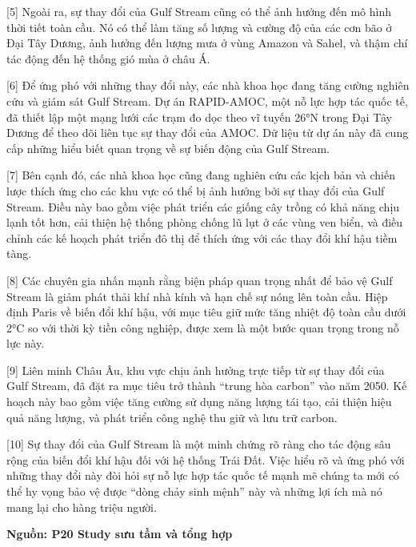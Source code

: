 \documentclass[12pt,a4paper,twoside]{article}
\newenvironment{readingpassage}[1][]{%
    \begin{tcolorbox}[enhanced, colback=grayLight, colframe=secondaryBlue,
        coltitle=textDark, fonttitle=\bfseries, title={#1},
        rounded corners, arc=3mm, boxrule=1pt,
        left=15pt, right=15pt, top=10pt, bottom=10pt,
        breakable, before skip=10pt, after skip=10pt, drop fuzzy shadow]
    \setstretch{1.3}
}{\end{tcolorbox}}
\begin{document}
\begin{readingpassage}[]
[5] Ngoài ra, sự thay đổi của Gulf Stream cũng có thể ảnh hưởng đến mô hình thời tiết toàn cầu. Nó có thể làm tăng số lượng và cường độ của các cơn bão ở Đại Tây Dương, ảnh hưởng đến lượng mưa ở vùng Amazon và Sahel, và thậm chí tác động đến hệ thống gió mùa ở châu Á.

[6] Để ứng phó với những thay đổi này, các nhà khoa học đang tăng cường nghiên cứu và giám sát Gulf Stream. Dự án RAPID-AMOC, một nỗ lực hợp tác quốc tế, đã thiết lập một mạng lưới các trạm đo dọc theo vĩ tuyến 26°N trong Đại Tây Dương để theo dõi liên tục sự thay đổi của AMOC. Dữ liệu từ dự án này đã cung cấp những hiểu biết quan trọng về sự biến động của Gulf Stream.

[7] Bên cạnh đó, các nhà khoa học cũng đang nghiên cứu các kịch bản và chiến lược thích ứng cho các khu vực có thể bị ảnh hưởng bởi sự thay đổi của Gulf Stream. Điều này bao gồm việc phát triển các giống cây trồng có khả năng chịu lạnh tốt hơn, cải thiện hệ thống phòng chống lũ lụt ở các vùng ven biển, và điều chỉnh các kế hoạch phát triển đô thị để thích ứng với các thay đổi khí hậu tiềm tàng.

[8] Các chuyên gia nhấn mạnh rằng biện pháp quan trọng nhất để bảo vệ Gulf Stream là giảm phát thải khí nhà kính và hạn chế sự nóng lên toàn cầu. Hiệp định Paris về biến đổi khí hậu, với mục tiêu giữ mức tăng nhiệt độ toàn cầu dưới 2°C so với thời kỳ tiền công nghiệp, được xem là một bước quan trọng trong nỗ lực này.

[9] Liên minh Châu Âu, khu vực chịu ảnh hưởng trực tiếp từ sự thay đổi của Gulf Stream, đã đặt ra mục tiêu trở thành ``trung hòa carbon'' vào năm 2050. Kế hoạch này bao gồm việc tăng cường sử dụng năng lượng tái tạo, cải thiện hiệu quả năng lượng, và phát triển công nghệ thu giữ và lưu trữ carbon.

[10] Sự thay đổi của Gulf Stream là một minh chứng rõ ràng cho tác động sâu rộng của biến đổi khí hậu đối với hệ thống Trái Đất. Việc hiểu rõ và ứng phó với những thay đổi này đòi hỏi sự nỗ lực hợp tác quốc tế mạnh mẽ chúng ta mới có thể hy vọng bảo vệ được ``dòng chảy sinh mệnh'' này và những lợi ích mà nó mang lại cho hàng triệu người.

\hfill \textbf{Nguồn: P20 Study sưu tầm và tổng hợp}
\end{readingpassage}
\end{document}
